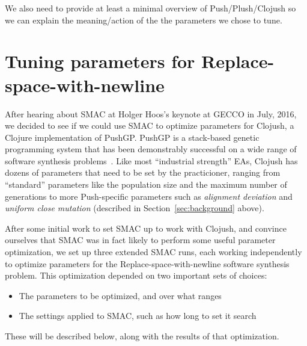 \documentclass{llncs}
\begin{document}
We also need to provide at least a minimal overview of Push/Plush/Clojush so
we can explain the meaning/action of the the parameters we chose to tune. 

\section{Tuning parameters for Replace-space-with-newline}
\label{sec:tuningRSWN}



After hearing about SMAC at Holger Hoos's keynote at GECCO in July, 2016, we
decided to see if we could use SMAC to optimize parameters for Clojush, a
Clojure implementation of PushGP. PushGP is a stack-based genetic programming
system that has been demonstrably successful on a wide range of software
synthesis problems~\cite{Helmuth:GECCO:2015}. Like most ``industrial
strength'' EAs, Clojush has dozens of parameters that need to be set by the
practicioner, ranging from ``standard'' parameters like the population size
and the maximum number of generations to more Push-specific parameters
such as \emph{alignment deviation} and \emph{uniform close mutation} (described
in Section~\ref{sec:background} above).

After some initial work to set SMAC up to work with Clojush, and convince
ourselves that SMAC was in fact likely to perform some useful parameter
optimization, we set up three extended SMAC runs, each working independently
to optimize parameters for the Replace-space-with-newline software synthesis 
problem.
This optimization depended on two important sets of choices:
\begin{itemize}
	\item The parameters to be optimized, and over what ranges
	\item The settings applied to SMAC, such as how long to set it search
\end{itemize}
These will be described below, along with the results of that optimization.
\end{document}
